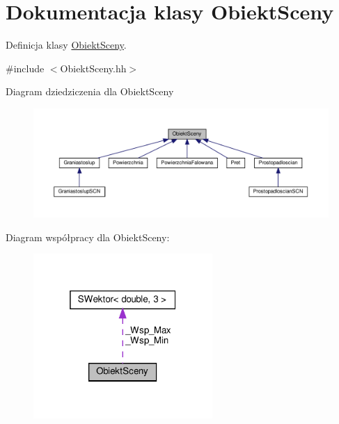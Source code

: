 \hypertarget{classObiektSceny}{}\section{Dokumentacja klasy Obiekt\+Sceny}
\label{classObiektSceny}


Definicja klasy \hyperlink{classObiektSceny}{Obiekt\+Sceny}.  




{\ttfamily \#include $<$Obiekt\+Sceny.\+hh$>$}



Diagram dziedziczenia dla Obiekt\+Sceny\nopagebreak
\begin{figure}[H]
\begin{center}
\leavevmode
\includegraphics[width=350pt]{classObiektSceny__inherit__graph}
\end{center}
\end{figure}


Diagram współpracy dla Obiekt\+Sceny\+:\nopagebreak
\begin{figure}[H]
\begin{center}
\leavevmode
\includegraphics[width=193pt]{classObiektSceny__coll__graph}
\end{center}
\end{figure}
